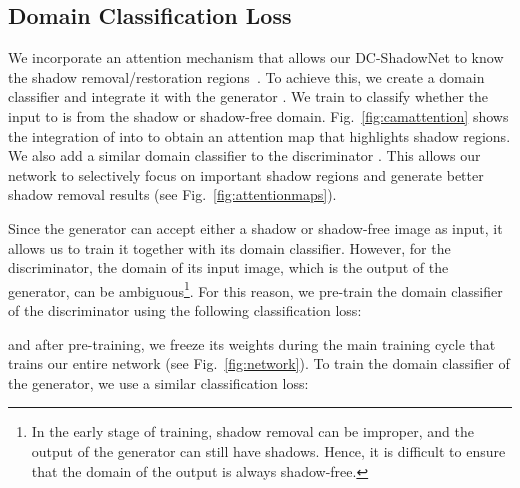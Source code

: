 \documentclass[10pt,twocolumn,letterpaper]{article}
\begin{document}
\subsection{Domain Classification Loss}
We incorporate an attention mechanism that allows our DC-ShadowNet to know the shadow removal/restoration regions~\cite{zhou2016learning, qian2018attentive, Kim2020U-GAT-IT:}. 
To achieve this, we create a domain classifier  and integrate it with the generator . We train  to classify whether the input to  is from the shadow or shadow-free domain. Fig.~\ref{fig:camattention} shows the integration of  into  to obtain an attention map  that highlights shadow regions. 
We also add a similar domain classifier  to the discriminator .
This allows our network to selectively focus on important shadow regions and generate better shadow removal results (see Fig.~\ref{fig:attentionmaps}).

Since the generator can accept either a shadow or shadow-free image as input, it allows us to train it together with its domain classifier. However, for the discriminator, the domain of its input image, which is the output of the generator, can be ambiguous\footnote{In the early stage of training, shadow removal can be improper, and the output of the generator can still have shadows. Hence, it is difficult to ensure that the domain of the output is always shadow-free.}.
For this reason, we pre-train the domain classifier of the discriminator using the following classification loss:

and after pre-training, we freeze its weights during the main training cycle that trains our entire network (see Fig.~\ref{fig:network}). To train the domain classifier of the generator, we use a similar classification loss:
\end{document}
